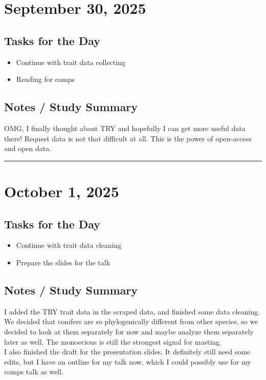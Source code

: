 \documentclass[12pt]{article}
\begin{document}
\section*{September 30, 2025}

\subsection*{Tasks for the Day}
\begin{itemize}
    \item Continue with trait data collecting
    \item Reading for comps
\end{itemize}
\subsection*{Notes / Study Summary}
OMG, I finally thought about TRY and hopefully I can get more useful data there! Request data is not that difficult at all. This is the power of open-access and open data.

\vspace{1em}
\hrule
\vspace{1em}

\section*{October 1, 2025}

\subsection*{Tasks for the Day}
\begin{itemize}
    \item Continue with trait data cleaning
    \item Prepare the slides for the talk
\end{itemize}
\subsection*{Notes / Study Summary}
I added the TRY trait data in the scraped data, and finished some data cleaning. We decided that conifers are so phylogenically different from other species, so we decided to look at them separately for now and maybe analyze them separately later as well. The monoecious is still the strongest signal for masting.\\
I also finished the draft for the presentation slides. It definitely still need some edits, but I have an outline for my talk now, which I could possibly use for my comps talk as well.
\end{document}
